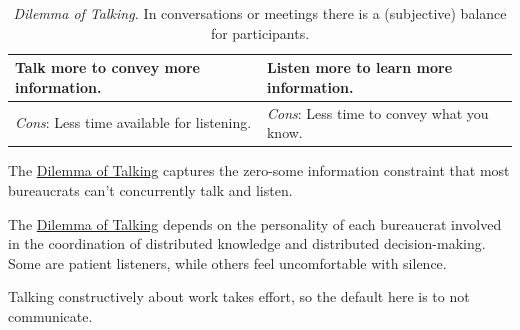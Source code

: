 \begin{center}
\begin{table}[H] %
\begin{tabular}{ | m{\dilemmatablewidth}| m{\dilemmatablewidth} | } 
  \hline
  \textbf{Talk more to convey more information.} & 
  \textbf{Listen more to learn more information.} \\ 
  \hline
  \textit{Cons}: Less time available for listening. & 
  \textit{Cons}: Less time to convey what you know. \\  
  \hline
\end{tabular}
\caption{
\textit{Dilemma of Talking.}
In conversations or meetings there is a (subjective) balance for participants.
}
\label{table:dilemma-personal-talk-or-listen}
\end{table}
\end{center}

The \hyperref[table:dilemma-personal-talk-or-listen]{Dilemma of Talking} captures the zero-some information constraint that most bureaucrats can't concurrently talk and listen. 

The \hyperref[table:dilemma-personal-talk-or-listen]{Dilemma of Talking} depends on the personality of each bureaucrat involved in the coordination of distributed knowledge and distributed decision-making. Some are patient listeners, while others feel uncomfortable with silence.

Talking constructively about work takes effort, so the default here is to not communicate. 


